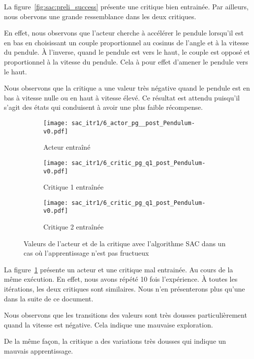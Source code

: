 La figure~\ref{fig:sac:preli_success} présente une critique bien entrainée. Par
ailleurs, nous obervons une grande ressemblance dans les deux critiques.

En effet, nous observons que l'acteur cherche à accélérer le pendule lorsqu'il
est en bas en choisissant un couple proportionnel au cosinus de l'angle et à la
vitesse du pendule. À l'inverse, quand le pendule est vers le haut, le couple
est opposé et proportionnel à la vitesse du pendule. Cela à pour effet d'amener
le pendule vers le haut.

Nous observons que la critique a une valeur très négative quand le pendule est
en bas à vitesse nulle ou en haut à vitesse élevé. Ce résultat est attendu
puisqu'il s'agit des états qui conduisent à avoir une plus faible récompense.

\begin{figure}[H]
    \centering
    \begin{subfigure}{0.3\textwidth}
        \texttt{[image: sac\_itr1/6\_actor\_pg\_\_post\_Pendulum-v0.pdf]}
        \caption{Acteur entraîné}
    \end{subfigure}
    \begin{subfigure}{0.3\textwidth}
        \texttt{[image: sac\_itr1/6\_critic\_pg\_q1\_post\_Pendulum-v0.pdf]}
        \caption{Critique 1 entraînée}
    \end{subfigure}
    \begin{subfigure}{0.3\textwidth}
        \texttt{[image: sac\_itr1/6\_critic\_pg\_q1\_post\_Pendulum-v0.pdf]}
        \caption{Critique 2 entraînée}
    \end{subfigure}
    \caption{Valeurs de l'acteur et de la critique avec l'algorithme SAC dans un cas où l'apprentissage n'est pas fructueux}\label{fig:sac:preli_failed}
\end{figure}

La figure~\ref{fig:sac:preli_failed} présente un acteur et une critique mal
entrainée. Au cours de la même exécution. En effet, nous avons répété 10 fois
l'expérience. À toutes les itérations, les deux critiques sont similaires. Nous
n'en présenterons plus qu'une dans la suite de ce document.

Nous observons que les transitions des valeurs sont très dousses
particulièrement quand la vitesse est négative. Cela indique une mauvaise
exploration.

De la même façon, la critique a des variations très dousses qui indique un
mauvais apprentissage.

